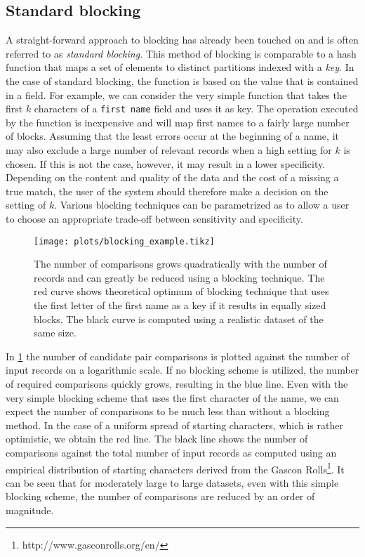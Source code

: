 

\subsection{Standard blocking}
\label{sec:standard_blocking}

A straight-forward approach to blocking has already been touched on and is often referred to as \emph{standard blocking}.
This method of blocking is comparable to a hash function that maps a set of elements to distinct partitions indexed with a \emph{key}.
In the case of standard blocking, the function is based on the value that is contained in a field.
For example, we can consider the very simple function that takes the first $k$ characters of a \texttt{first name} field and uses it as key.
The operation executed by the function is inexpensive and will map first names to a fairly large number of blocks.
Assuming that the least errors occur at the beginning of a name, it may also exclude a large number of relevant records when a high setting for $k$ is chosen.
If this is not the case, however, it may result in a lower specificity.
Depending on the content and quality of the data and the cost of a missing a true match, the user of the system should therefore make a decision on the setting of $k$.
Various blocking techniques can be parametrized as to allow a user to choose an appropriate trade-off between sensitivity and specificity.

\begin{figure}
    \centering
    \texttt{[image: plots/blocking\_example.tikz]}
    \caption{The number of comparisons grows quadratically with the number of records and can greatly be reduced using a blocking technique. The red curve shows theoretical optimum of blocking technique that uses the first letter of the first name as a key if it results in equally sized blocks. The black curve is computed using a realistic dataset of the same size.}
    \label{fig:blocking_example}
\end{figure}

In \cref{fig:blocking_example} the number of candidate pair comparisons is plotted against the number of input records on a logarithmic scale.
If no blocking scheme is utilized, the number of required comparisons quickly grows, resulting in the blue line.
Even with the very simple blocking scheme that uses the first character of the name, we can expect the number of comparisons to be much less than without a blocking method.
In the case of a uniform spread of starting characters, which is rather optimistic, we obtain the red line.
The black line shows the number of comparisons against the total number of input records as computed using an empirical distribution of starting characters derived from the Gascon Rolls\footnote{http://www.gasconrolls.org/en/}.
It can be seen that for moderately large to large datasets, even with this simple blocking scheme, the number of comparisons are reduced by an order of magnitude.

